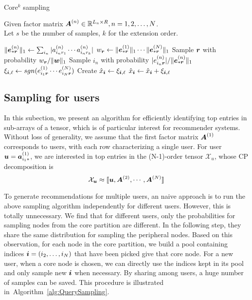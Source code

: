 \documentclass[letterpaper]{article}
\newcommand{\Sca}[3]{{#1}^{(#2)}_{i_#2#3}}%
\newcommand{\anr}[2]{\Sca{a}{#1}{#2}}
\newcommand{\enr}[2]{\Sca{e}{#1}{\V{#2}}}
\newcommand{\score}[1]{\xi_{\V{i},#1}}
\newcommand{\T}[1]{\mathcal{#1}}
\newcommand{\KT}[1]{\llbracket #1 \rrbracket}
\newcommand{\V}[1]{{\boldsymbol{{\MakeLowercase{#1}}}}}
\newcommand{\ColVec}[3]{\V{#1}^{(#2)}_{#3}}
\newcommand{\NormColE}[2]{\norm{\ColVec{e}{#1}{*\V{#2}}}{1}}
\newcommand{\RowVecA}[1]{\V{a}^{(#1)}_{i_#1*}}
\newcommand{\coord}{(i_1,i_2,\ldots,i_N)}
\newcommand{\predx}{\hat{x}_{\V{i}}}
\newcommand{\M}[1]{{\boldsymbol{{\MakeUppercase{#1}}}}}
\newcommand{\FacMat}[2]{\M{#1}^{(#2)}}
\newcommand{\norm}[2]{\|#1\|_{#2}}
\newcommand{\Alg}[1]{Algorithm~\ref{alg:#1}}
\begin{document}
\begin{algorithm}[!ht]
    \caption{Core$^k$ sampling}
    \label{alg:CoreExtensionSampling}
    Given factor matrix $\FacMat{A}{n}\in \mathbb{R}^{L_n\times R}, n = 1,2,\ldots,N$.\\
    Let $s$ be the number of samples, $k$ for the extension order.
    \begin{algorithmic}[1]
    \For{$\V{r}\in{\underbrace{R\times \cdots \times R}_{k}}$}
    \State $\NormColE{n}{r} \leftarrow \sum_{i_n}|\anr{n}{r_1}\cdots\anr{n}{r_k}|$
    \EndFor
    \State $w_{\V{r}} \leftarrow \NormColE{1}{r} \cdots \NormColE{N}{r} $
    \EndFor
    \State Sample $\V{r}$ with probability $w_\V{r}/\norm{\V{W}}{1}$
    \label{line:nodes}
    \State Sample $i_n$ with probability $|\enr{n}{r}|/\NormColE{n}{r}$
    \EndFor
    \State
        $\score{\ell} \leftarrow sgn(\enr{1}{r}\cdots\enr{N}{r})$
    \If {$\V{i}=\coord$ has not been sampled}
    \State  Create $\predx \leftarrow \score{\ell} $
    \Else
    \State $\predx \leftarrow \predx + \score{\ell}$
    \EndIf
    \EndFor
    \end{algorithmic}
\end{algorithm}

\subsection{Sampling for users}
In this subection, 
we present an algorithm for efficiently identifying top entries in sub-arrays of a tensor,
which is of particular interest for recommender systems. 
Without loss of generality, 
we assume that the first factor matrix $\FacMat{A}{1}$ corresponds to users, 
with each row characterizing a single user. 
For user $\V{u} = \RowVecA{1}$, 
we are interested in top entries in the (N-1)-order tensor $\T{X}_u$,
whose CP decomposition is
\begin{align}
    \T{X}_{\V{u}} \approx \KT{\V{u},\FacMat{A}{2},\cdots,\FacMat{A}{N}} 
\end{align}

To generate recommendations for multiple users, 
an naive approach is to run the above sampling algorithm independently for different users. 
However, this is totally unnecessary. 
We find that for different users, 
only the probabilities for sampling nodes from the core partition are different. 
In the following step, they share the same distribution for sampling the peripheral nodes. 
Based on this observation, for each node in the core partition, 
we build a pool containing indices $\V{i}=(i_2,\ldots,i_N)$ that have been picked give that core node. 
For a new user, when a core node is chosen, 
we can directly use the indices kept in its pool and only sample new $\V{i}$ when necessary. 
By sharing among users, a huge number of samples can be saved. 
This procedure is illustrated in~\Alg{QuerySampling}.
\end{document}
